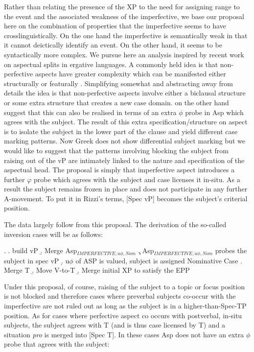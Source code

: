 \documentclass[11pt]{article}
\begin{document}
 Rather than relating the presence of the XP to the need for assigning range to the event and the associated weakness of the imperfective, we
base our proposal here on the combination of properties that the imperfective seems to have crosslinguistically.  On the one hand the imperfective is semantically weak in that it cannot deictically identify an event.  On the other hand, it seems to be syntactically more complex.  We
pursue here an analysis inspired by recent work on aspectual splits in ergative languages.  
A commonly held idea is that non-perfective aspects have greater complexity which can be manifested  either structurally \citep{coon:13, coon-preminger:15,laka:06} or featurally \citep{kalin-vanurk:12}. Simplifying somewhat and abstracting away from details the idea is that non-perfective aspects involve either a biclausal structure or some extra structure that creates a new case domain.  \citet{kalin-vanurk:12} on the other hand suggest that this can also be realised in terms of an extra $\phi$ probe in Asp which agrees with the subject.  The result of this extra specification/structure on aspect is to isolate the subject in the lower part of the clause and yield different case marking patterns.  Now Greek does not show differential subject marking but we would like to suggest that the patterns involving blocking the subject from raising out of the vP are intimately linked to the nature and specification of the aspectual head.  The proposal is simply that imperfective aspect  introduces a further $\varphi$ probe which agrees with the subject and case licenses it in-situ.  As a result the subject remains frozen in place and does not participate in any further A-movement.  To put it in Rizzi's terms, [Spec vP] becomes the subject's criterial position.  

The data largely follow from this proposal.  The derivation of the so-called inversion cases will be as follows:

\ex.
\a. build vP
\b. Merge Asp$_{IMPERFECTIVE, u\phi, Nom}$
\c. Asp$_{IMPERFECTIVE, u\phi, Nom}$ probes the subject in spec vP
\d. u$\phi$ of ASP is valued, subject is assigned Nominative Case
\e. Merge T
\b. Move V-to-T
\b. Merge initial XP to satisfy the EPP


Under this proposal, of course, raising of the subject to a topic or focus position is not blocked and therefore cases where preverbal subjects co-occur with the imperfective are not ruled out as long as the subject is in a higher-than-Spec-TP position.  As for cases where perfective aspect co occurs with postverbal, in-situ subjects, the subject agrees with T (and is thus case licensed by T) and a situation \textit{pro} is merged into [Spec T]. In these cases Asp does not have an extra $\phi$ probe that agrees with the subject:
\end{document}
